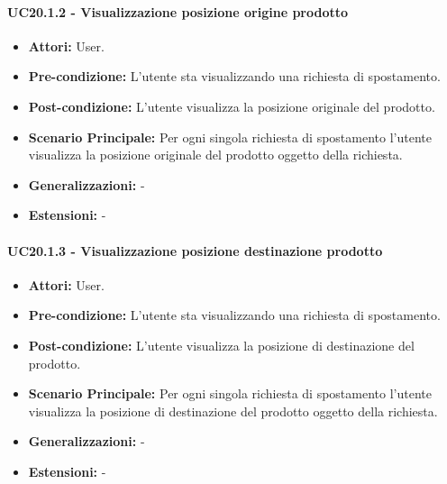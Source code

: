 \paragraph{UC20.1.2 - Visualizzazione posizione origine prodotto}
\begin{itemize}
    \item \textbf{Attori:} User.
    \item \textbf{Pre-condizione:}  L'utente sta visualizzando una richiesta di spostamento.
    \item \textbf{Post-condizione:} L'utente visualizza la posizione originale del prodotto.
    \item \textbf{Scenario Principale:} Per ogni singola richiesta di spostamento l'utente visualizza la posizione originale del prodotto oggetto della richiesta.
    \item \textbf{Generalizzazioni:} -
    \item \textbf{Estensioni:} -
\end{itemize}


\paragraph{UC20.1.3 - Visualizzazione posizione destinazione prodotto}
\begin{itemize}
    \item \textbf{Attori:} User.
    \item \textbf{Pre-condizione:}  L'utente sta visualizzando una richiesta di spostamento.
    \item \textbf{Post-condizione:} L'utente visualizza la posizione di destinazione del prodotto.
    \item \textbf{Scenario Principale:} Per ogni singola richiesta di spostamento l'utente visualizza la posizione di destinazione del prodotto oggetto della richiesta.
    \item \textbf{Generalizzazioni:} -
    \item \textbf{Estensioni:} -
\end{itemize}